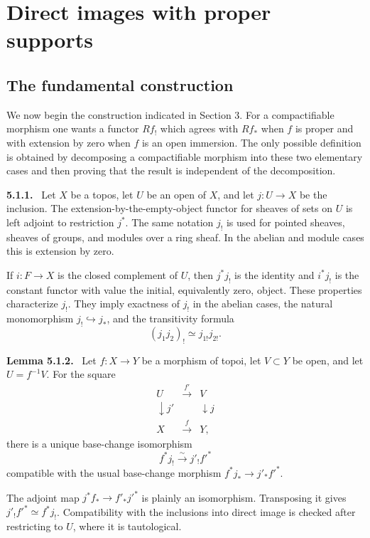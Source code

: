 \documentclass[12pt]{article}
\newenvironment{statement}[1]{\par\medskip\noindent\textbf{#1.}\ }{\par\medskip}
\begin{document}
\section{Direct images with proper supports}

\subsection{The fundamental construction}

We now begin the construction indicated in Section 3. For a compactifiable morphism one wants a functor \(Rf_!\) which agrees with \(Rf_*\) when \(f\) is proper and with extension by zero when \(f\) is an open immersion. The only possible definition is obtained by decomposing a compactifiable morphism into these two elementary cases and then proving that the result is independent of the decomposition.

\begin{statement}{5.1.1}
Let \(X\) be a topos, let \(U\) be an open of \(X\), and let \(j:U\to X\) be the inclusion. The extension-by-the-empty-object functor for sheaves of sets on \(U\) is left adjoint to restriction \(j^*\). The same notation \(j_!\) is used for pointed sheaves, sheaves of groups, and modules over a ring sheaf. In the abelian and module cases this is extension by zero.
\end{statement}

If \(i:F\to X\) is the closed complement of \(U\), then \(j^*j_!\) is the identity and \(i^*j_!\) is the constant functor with value the initial, equivalently zero, object. These properties characterize \(j_!\). They imply exactness of \(j_!\) in the abelian cases, the natural monomorphism \(j_!\hookrightarrow j_*\), and the transitivity formula
\[
(j_1j_2)_!\simeq j_{1!}j_{2!}.
\]

\begin{statement}{Lemma 5.1.2}
Let \(f:X\to Y\) be a morphism of topoi, let \(V\subset Y\) be open, and let \(U=f^{-1}V\). For the square
\[
\begin{array}{ccc}
U&\xrightarrow{f'}&V\\
\downarrow j'&&\downarrow j\\
X&\xrightarrow{f}&Y,
\end{array}
\]
there is a unique base-change isomorphism
\[
f^*j_!\xrightarrow{\sim}j'_!f'^*
\]
compatible with the usual base-change morphism \(f^*j_*\to j'_*f'^*\).
\end{statement}

The adjoint map \(j^*f_*\to f'_*j'^*\) is plainly an isomorphism. Transposing it gives \(j'_!f'^*\simeq f^*j_!\). Compatibility with the inclusions into direct image is checked after restricting to \(U\), where it is tautological.
\end{document}
